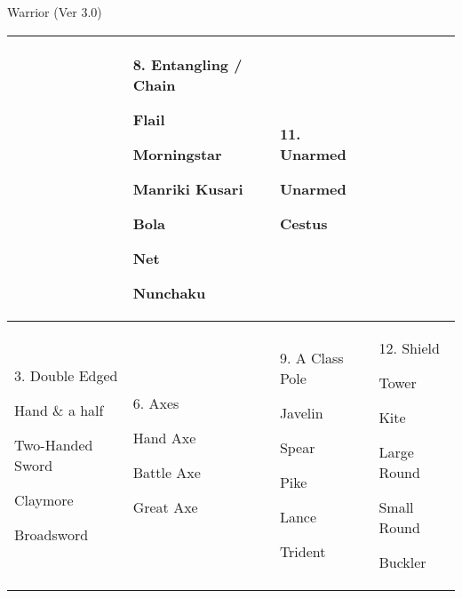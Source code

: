 \begin{Chapter}{Warrior (Ver 3.0)}
\begin{table*}
\begin{tabularx}{\textwidth}{|X|X|X|X|}
&

8. Entangling / Chain
\begin{Itemize}
\item Flail
\item Morningstar  
\item Manriki Kusari
\item Bola
\item Net
\item Nunchaku
\end{Itemize}

&

11. Unarmed
\begin{Itemize}
\item Unarmed
\item Cestus
\end{Itemize}
\\ \hline

3. Double Edged
\begin{Itemize}
\item Hand \& a half
\item Two-Handed Sword
\item Claymore
\item Broadsword
\end{Itemize}

&

6. Axes
\begin{Itemize}
\item Hand Axe
\item Battle Axe  
\item Great Axe 
\end{Itemize}

&

9. A Class Pole
\begin{Itemize}
\item Javelin
\item Spear
\item Pike
\item Lance
\item Trident
\end{Itemize}

&

12. Shield
\begin{Itemize}
\item Tower  
\item Kite
\item Large Round
\item Small Round  
\item Buckler
\end{Itemize}
\\ \hline
\end{tabularx}


\end{table*}
\end{Chapter}
